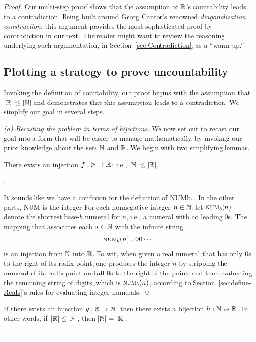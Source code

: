 \begin{proof}
Our multi-step proof shows that the assumption of $\mathbb{R}$'s countability
leads to a contradiction.  Being built around Georg Cantor's renowned
{\it diagonalization construction},  this
argument provides the most sophisticated proof by contradiction in our
text.  The reader might want to review the reasoning underlying such
argumentation, in Section~\ref{sec:Contradiction}, as a ``warm-up.''

\subsection{Plotting a strategy to prove uncountability}
\label{sec:the-diag-strategy}

Invoking the definition of countability, our proof begins with the
assumption that $|\mathbb{R}| \leq |\mathbb{N}|$ and demonstrates that this assumption
leads to a contradiction.  We simplify our goal in several steps.

{\it (a) Recasting the problem in terms of bijections.}
We now set out to recast our goal into a form that will be easier to
manage mathematically, by invoking our prior knowledge about the sets
$\mathbb{N}$ and $\mathbb{R}$.  We begin with two simplifying lemmas.

\begin{lemma}
\label{lem:N-leq-R}
There exists an injection $f: \mathbb{N} \rightarrow \mathbb{R}$; i.e., $|\mathbb{N}| \leq
|\mathbb{R}|$.
\end{lemma}

.

{\Denis It sounds like we have a confusion for the definition of NUMb...
In the other parts, NUM is the integer}
%
For each nonnegative integer $n \in \mathbb{N}$, let $\mbox{\sc num}_b(n)$
denote the shortest base-$b$ numeral for $n$, i.e., a numeral with no
leading $0$s.  The mapping that associates each $n \in \mathbb{N}$ with the
infinite string
\[ \mbox{\sc num}_b(n) \ . \ 00 \cdots \]
is an injection from $\mathbb{N}$ into $\mathbb{R}$.  To wit, when given a real
numeral that has only $0$s to the right of its radix point, one
produces the integer $n$ by stripping the numeral of its radix point
and all $0$s to the right of the point, and then evaluating the
remaining string of digits, which is $\mbox{\sc num}_b(n)$, according
to Section~\ref{sec:define-Reals}'s rules for evaluating integer
numerals.  \qed

\begin{lemma}
\label{lem:N-=-R}
If there exists an injection $g: \mathbb{R} \rightarrow \mathbb{N}$, then there exists
a bijection $h: \mathbb{N} \leftrightarrow \mathbb{R}$.  In other words, if $|\mathbb{R}| \leq
|\mathbb{N}|$, then $|\mathbb{N}| = |\mathbb{R}|$.
\end{lemma}


\end{proof}
